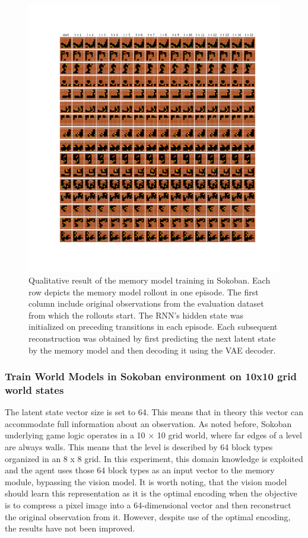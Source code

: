 \begin{figure}[H]
\includegraphics[width=1\textwidth,keepaspectratio]{figures/Sokoban_memory.png}
\caption[Qualitative result of the World Models memory model training in Sokoban]{Qualitative result of the memory model training in Sokoban. Each row depicts the memory model rollout in one episode. The first column include original observations from the evaluation dataset from which the rollouts start. The RNN's hidden state was initialized on preceding transitions in each episode. Each subsequent reconstruction was obtained by first predicting the next latent state by the memory model and then decoding it using the VAE decoder.}
\label{Fig.WM_Sokoban_memory}
\end{figure}

\subsubsection{Train World Models in Sokoban environment on 10x10 grid world states}

The latent state vector size is set to 64. This means that in theory this vector can accommodate full information about an observation. As noted before, Sokoban underlying game logic operates in a 10 × 10 grid world, where far edges of a level are always walls. This means that the level is described by 64 block types organized in an 8 x 8 grid. In this experiment, this domain knowledge is exploited and the agent uses those 64 block types as an input vector to the memory module, bypassing the vision model. It is worth noting, that the vision model should learn this representation as it is the optimal encoding when the objective is to compress a pixel image into a 64-dimensional vector and then reconstruct the original observation from it. However, despite use of the optimal encoding, the results have not been improved.

